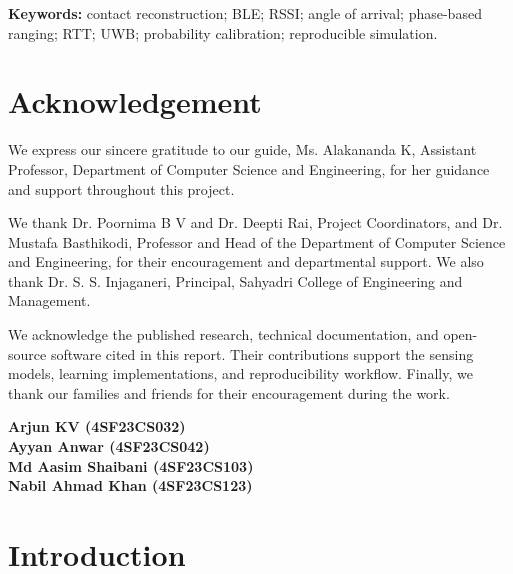 \documentclass[12pt,a4paper]{report}
\begin{document}
\noindent\textbf{Keywords:} contact reconstruction; BLE; RSSI; angle of arrival; phase-based ranging; RTT; UWB; probability calibration; reproducible simulation.
\chapter*{Acknowledgement}
We express our sincere gratitude to our guide, Ms. Alakananda K, Assistant Professor, Department of Computer Science and Engineering, for her guidance and support throughout this project.

We thank Dr. Poornima B V and Dr. Deepti Rai, Project Coordinators, and Dr. Mustafa Basthikodi, Professor and Head of the Department of Computer Science and Engineering, for their encouragement and departmental support. We also thank Dr. S. S. Injaganeri, Principal, Sahyadri College of Engineering and Management.

We acknowledge the published research, technical documentation, and open-source software cited in this report. Their contributions support the sensing models, learning implementations, and reproducibility workflow. Finally, we thank our families and friends for their encouragement during the work.
\begin{flushright}\textbf{Arjun KV (4SF23CS032)}\\\textbf{Ayyan Anwar (4SF23CS042)}\\\textbf{Md Aasim Shaibani (4SF23CS103)}\\\textbf{Nabil Ahmad Khan (4SF23CS123)}\end{flushright}
\renewcommand{\contentsname}{Table of Contents}
\tableofcontents{}
\listoffigures{}
\listoftables{}
\clearpage\pagestyle{fancy}\fancyhf{}
\renewcommand{\headrulewidth}{.5pt}\renewcommand{\footrulewidth}{.5pt}

\chapter{Introduction}
\end{document}
